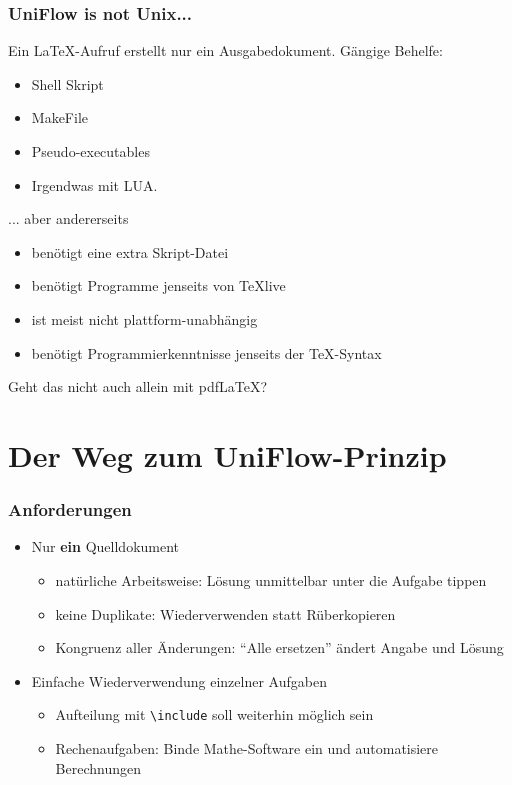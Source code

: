 \documentclass[]{beamer}
\begin{document}
\begin{frame}
\frametitle{UniFlow is not Unix...}

Ein \LaTeX{}-Aufruf erstellt nur ein Ausgabedokument. Gängige Behelfe:
\begin{itemize}[<+->]
\item Shell Skript
\item MakeFile
\item Pseudo-executables
\item Irgendwas mit LUA.
\end{itemize}
\pause\medskip ... aber andererseits
\begin{itemize}[<+->]
\item benötigt eine extra Skript-Datei
\item benötigt Programme jenseits von \TeX{}live
\item ist meist nicht plattform-unabhängig
\item benötigt Programmierkenntnisse jenseits der \TeX{}-Syntax
\end{itemize}
\pause\medskip Geht das nicht auch allein mit pdf\LaTeX{}?
\end{frame}

\section{Der Weg zum UniFlow-Prinzip}

\begin{frame}
\frametitle{Anforderungen}

\begin{itemize}[<+->]
\item Nur \textbf{ein} Quelldokument
\begin{itemize}[<+->]
\item natürliche Arbeitsweise: Lösung unmittelbar unter die Aufgabe tippen
\item keine Duplikate: Wiederverwenden statt Rüberkopieren
\item Kongruenz aller Änderungen: \enquote{Alle ersetzen} ändert Angabe und Lösung
\end{itemize}
\item Einfache Wiederverwendung einzelner Aufgaben
\begin{itemize}[<+->]
\item Aufteilung mit \texttt{\textbackslash{}include} soll weiterhin möglich sein
\item Rechenaufgaben: Binde Mathe-Software ein und automatisiere Berechnungen
\end{itemize}
\end{itemize}

\end{frame}
\end{document}
